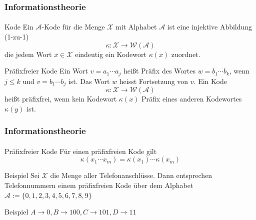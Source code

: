 \documentclass{beamer}
\begin{document}
\begin{frame}
    \frametitle{Informationstheorie}
\framesubtitle{}

\begin{block}{Kode}
Ein $\mathcal{A}$-Kode für die Menge $\mathcal{X}$ mit Alphabet $\mathcal{A}$ ist eine injektive Abbildung (1-zu-1)
$$ \kappa : \mathcal{X} \to \mathcal{W} (\mathcal{A})$$
die jedem Wort $x \in \mathcal{X}$ eindeutig ein Kodewort $\kappa(x)$ zuordnet.
\end{block}


\begin{block}{Präfixfreier Kode}
Ein Wort $v = a_1 \cdots a_j$ heißt Präfix des Wortes $w = b_1 \cdots b_k$, wenn $j \leq k$ und $v = b_1 \cdots b_j$ ist. Das Wort $w$ heisst Fortsetzung von $v$. Ein Kode $$ \kappa : \mathcal{X} \to \mathcal{W} (\mathcal{A})$$
 heißt präfixfrei, wenn kein Kodewort $\kappa(x)$ Präfix eines anderen Kodewortes $\kappa(y)$ ist. 
\end{block}

 \end{frame}


\begin{frame}
    \frametitle{Informationstheorie}
\framesubtitle{}

\begin{block}{Präfixfreier Kode}
Für einen präfixfreien Kode gilt 
$$ \kappa(x_1 \cdots x_m) = \kappa(x_1) \cdots \kappa(x_m)$$
\end{block}

\begin{block}{Beispiel}
Sei $\mathcal{X}$ die Menge aller Telefonanschlüsse. Dann entsprechen Telefonnummern einem präfixfreien Kode über dem Alphabet $\mathcal{A} := \{0, 1,2,3,4,5,6,7,8,9\}$
\end{block}

\begin{block}{Beispiel}
$A \rightarrow 0, B  \rightarrow 100, C \rightarrow 101, D \rightarrow 11$ 
\end{block}

 \end{frame}
\end{document}
